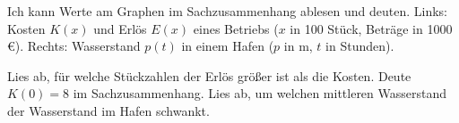 \begin{aufgabe}{Ich kann Werte am Graphen im Sachzusammenhang ablesen und deuten. Links: Kosten $K(x)$ und Erlös $E(x)$ eines Betriebs ($x$ in 100 Stück, Beträge in 1000 €). Rechts: Wasserstand $p(t)$ in einem Hafen ($p$ in m, $t$ in Stunden).}

\begin{ksys}[xmin=0,xmax=9,ymin=0,ymax=60,ystep=10,ablesen,xlabel=$x$,ylabel=in 1000 €]
\end{ksys}\ksysabstand\begin{ksys}[xmin=0,xmax=24,xstep=2,ymin=0,ymax=6,ablesen,xlabel=$t$ in h,ylabel=$p(t)$ in m]
\end{ksys}

\begin{teile}
\teil Lies ab, für welche Stückzahlen der Erlös größer ist als die Kosten. \leerfeld
\teil Deute $K(0) = 8$ im Sachzusammenhang.
\teil Lies ab, um welchen mittleren Wasserstand der Wasserstand im Hafen schwankt. \leerfeld
\end{teile}
\end{aufgabe}
